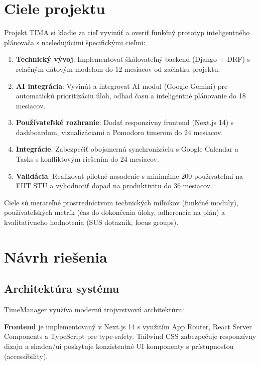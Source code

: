 \documentclass[10pt,twocolumn,twoside,slovak,a4paper]{article}
\begin{document}
\section{Ciele projektu}

Projekt TIMA si kladie za cieľ vyvinúť a overiť funkčný prototyp inteligentného plánovača s nasledujúcimi špecifickými cieľmi:

\begin{enumerate}
\item \textbf{Technický vývoj}: Implementovať škálovateľný backend (Django + DRF) s relačným dátovým modelom do 12 mesiacov od začiatku projektu.

\item \textbf{AI integrácia}: Vyvinúť a integrovať AI modul (Google Gemini) pre automatickú prioritizáciu úloh, odhad času a inteligentné plánovanie do 18 mesiacov.

\item \textbf{Používateľské rozhranie}: Dodať responzívny frontend (Next.js 14) s dashboardom, vizualizáciami a Pomodoro timerom do 24 mesiacov.

\item \textbf{Integrácie}: Zabezpečiť obojsmernú synchronizáciu s Google Calendar a Tasks s konfliktovým riešením do 24 mesiacov.

\item \textbf{Validácia}: Realizovať pilotné nasadenie s minimálne 200 používateľmi na FIIT STU a vyhodnotiť dopad na produktivitu do 36 mesiacov.
\end{enumerate}

Ciele sú merateľné prostredníctvom technických míľnikov (funkčné moduly), používateľských metrík (čas do dokončenia úlohy, adherencia na plán) a kvalitatívneho hodnotenia (SUS dotazník, focus groups).

\section{Návrh riešenia}

\subsection{Architektúra systému}

TimeManager využíva modernú trojvrstvovú architektúru:

\textbf{Frontend} je implementovaný v Next.js 14 s využitím App Router, React Server Components a TypeScript pre type-safety. Tailwind CSS zabezpečuje responzívny dizajn a shadcn/ui poskytuje konzistentné UI komponenty s prístupnosťou (accessibility).
\end{document}
